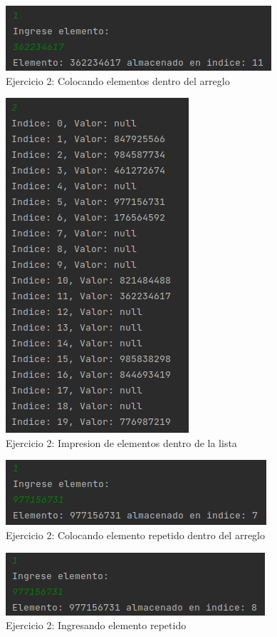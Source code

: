 \documentclass{article}
\begin{document}
			\begin{figure}[H]
				\centering
				\includegraphics{images/e210.png}
				\caption*{Ejercicio 2: Colocando elementos dentro del arreglo}
			\end{figure}
			
			\begin{figure}[H]
				\centering
				\includegraphics{images/e211.png}
				\caption*{Ejercicio 2: Impresion de elementos dentro de la lista}
			\end{figure}
			
			\begin{figure}[H]
				\centering
				\includegraphics{images/e212.png}
				\caption*{Ejercicio 2: Colocando elemento repetido dentro del arreglo}
			\end{figure}
			
			\begin{figure}[H]
				\centering
				\includegraphics{images/e213.png}
				\caption*{Ejercicio 2: Ingresando elemento repetido}
			\end{figure}
			
\end{document}
